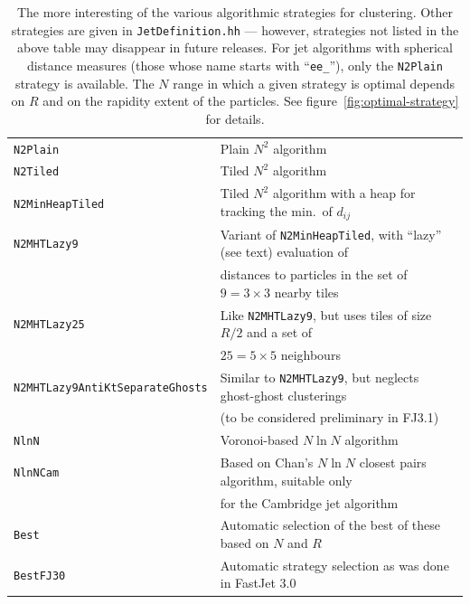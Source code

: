 \documentclass[12pt,a4]{article}
\newcommand{\ttt}[1]{{\small\texttt{#1}}}
\begin{document}
%
\begin{table}[bt]
  \begin{center}
    \begin{tabular}{ll}\toprule
      \ttt{N2Plain} & Plain $N^2$ algorithm\\
      \ttt{N2Tiled} & Tiled $N^2$ algorithm\\ 
      \ttt{N2MinHeapTiled} & Tiled $N^2$ algorithm with a heap for
      tracking the min.\ of $d_{ij}$ 
      \\
      \ttt{N2MHTLazy9} & Variant of \ttt{N2MinHeapTiled}, with
      ``lazy'' (see text) evaluation of \\ &
      distances to  particles in the set of $9=3\times3$ nearby
      tiles
      \\
      \ttt{N2MHTLazy25} & Like \ttt{N2MHTLazy9}, but uses tiles of
      size $R/2$ and a set of \\& $25=5\times5$ neighbours
      \\ 
      \ttt{N2MHTLazy9AntiKtSeparateGhosts} & Similar to
      \ttt{N2MHTLazy9}, but neglects ghost-ghost clusterings\\
      & (to be considered preliminary in FJ3.1)
      \\
      \ttt{NlnN} & Voronoi-based $N\ln N$ algorithm\\ 
      \ttt{NlnNCam} & Based on Chan's $N\ln N$ closest pairs
      algorithm, suitable only\\& for the Cambridge jet algorithm
      \\ 
      \ttt{Best} & Automatic selection of the best of these based on
      $N$ and $R$
      \\ 
      \ttt{BestFJ30} & Automatic strategy selection as was done in
      FastJet 3.0
      \\\bottomrule
    \end{tabular}
    \caption{The more interesting of the various algorithmic
      strategies for clustering. Other strategies are given in 
      \ttt{JetDefinition.hh} --- however, strategies not
      listed in the above table may disappear in future releases.
      For jet algorithms with spherical distance measures (those whose
      name starts with ``\ttt{ee\_}''), only the \ttt{N2Plain}
      strategy is available.  
      The $N$ range in which a given strategy is optimal depends on
      $R$ and on the rapidity extent of the particles. 
      See figure~\ref{fig:optimal-strategy} for details.
    }
    \label{tab:Strategies}
  \end{center}
\end{table}
\end{document}
